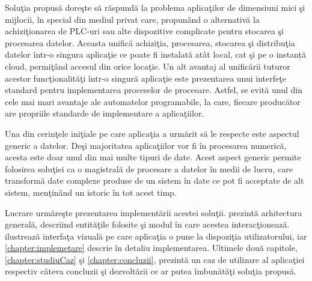 Soluţia propusă doreşte să răspundă la problema aplicaţilor de dimensiuni mici şi mijlocii, în special din mediul privat care, propunând o alternativă la achiziţionarea de PLC-uri sau alte dispozitive complicate pentru stocarea şi procesarea datelor. Aceasta unifică achiziţia, procesarea, stocarea şi distribuţia datelor într-o singura aplicaţie ce poate fi instalată atât local, cat şi pe o instanță cloud, permiţând accesul din orice locaţie. Un alt avantaj al unificării tuturor acestor funcţionalităţi într-o singură aplicaţie este prezentarea unui interfeţe standard pentru implementarea proceselor de procesare. Astfel, se evită unul din cele mai mari avantaje ale automatelor programabile, la care, fiecare producător are propriile standarde de implementare a aplicaţiilor.

Una din cerinţele iniţiale pe care aplicaţia a urmărit să le respecte este aspectul generic a datelor. Deşi majoritatea aplicaţiilor vor fi în procesarea numerică, acesta este doar unul din mai multe tipuri de date. Acest aspect generic permite folosirea soluţiei ca o magistrală de procesare a datelor în medii de lucru, care transformă date complexe produse de un sistem în date ce pot fi acceptate de alt sistem, menţinând un istoric în tot acest timp.

Lucrare urmăreşte prezentarea implementării acestei soluţii.  prezintă arhitectura generală, descriind entităţile folosite şi modul în care acestea interacţionează.  ilustrează interfaţa vizuală pe care aplicaţia o pune la dispoziţia utilizatorului, iar \cref{chapter:implemetare} descrie în detaliu implementarea. Ultimele două capitole, \ref{chapter:studiuCaz} şi \ref{chapter:concluzii}, prezintă un caz de utilizare al aplicaţiei respectiv câteva concluzii şi dezvoltării ce ar putea îmbunătăţi soluţia propusă.